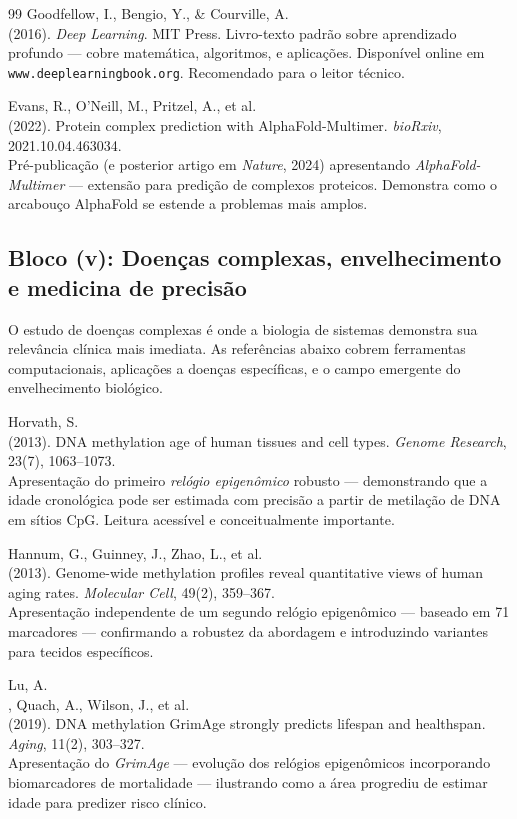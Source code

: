 \begin{thebibliography}{99}
 Goodfellow, I., Bengio, Y., \& Courville, A.\\ (2016). \emph{Deep Learning}. MIT Press. Livro-texto padrão sobre aprendizado profundo --- cobre matemática, algoritmos, e aplicações. Disponível online em \texttt{www.deeplearningbook.org}. Recomendado para o leitor técnico.

 Evans, R., O'Neill, M., Pritzel, A., et al.\\ (2022). Protein complex prediction with AlphaFold-Multimer. \emph{bioRxiv}, 2021.10.04.463034.\\ Pré-publicação (e posterior artigo em \emph{Nature}, 2024) apresentando \emph{AlphaFold-Multimer} --- extensão para predição de complexos proteicos. Demonstra como o arcabouço AlphaFold se estende a problemas mais amplos.



\subsection*{Bloco (v): Doenças complexas, envelhecimento e medicina de precisão}

O estudo de doenças complexas é onde a biologia de sistemas demonstra sua relevância clínica mais imediata. As referências abaixo cobrem ferramentas computacionais, aplicações a doenças específicas, e o campo emergente do envelhecimento biológico.

 Horvath, S.\\ (2013). DNA methylation age of human tissues and cell types. \emph{Genome Research}, 23(7), 1063--1073.\\ Apresentação do primeiro \emph{relógio epigenômico} robusto --- demonstrando que a idade cronológica pode ser estimada com precisão a partir de metilação de DNA em sítios CpG. Leitura acessível e conceitualmente importante.

 Hannum, G., Guinney, J., Zhao, L., et al.\\ (2013). Genome-wide methylation profiles reveal quantitative views of human aging rates. \emph{Molecular Cell}, 49(2), 359--367.\\ Apresentação independente de um segundo relógio epigenômico --- baseado em 71 marcadores --- confirmando a robustez da abordagem e introduzindo variantes para tecidos específicos.

 Lu, A.\\, Quach, A., Wilson, J., et al.\\ (2019). DNA methylation GrimAge strongly predicts lifespan and healthspan. \emph{Aging}, 11(2), 303--327.\\ Apresentação do \emph{GrimAge} --- evolução dos relógios epigenômicos incorporando biomarcadores de mortalidade --- ilustrando como a área progrediu de estimar idade para predizer risco clínico.


\end{thebibliography}
